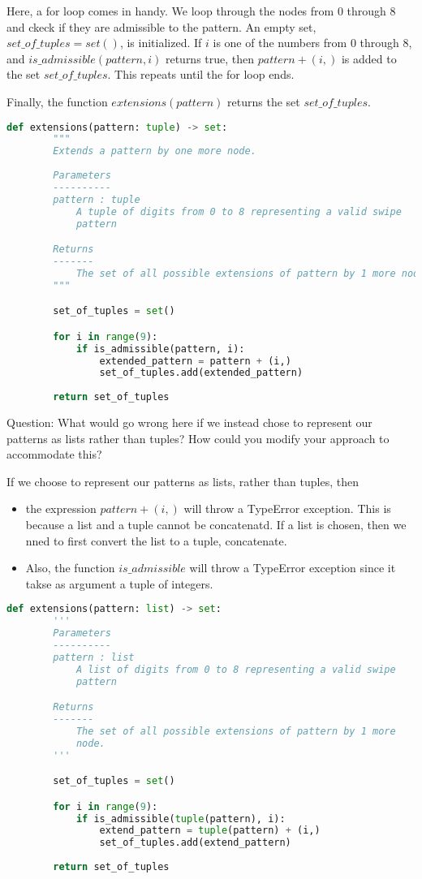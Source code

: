 \documentclass[12pt]{article}
\theoremstyle{definition}
\begin{document}
Here, a for loop comes in handy. We loop through the nodes from $0$ through $8$ and ckeck if they are admissible to the pattern. An empty set, $set\_of\_tuples = set()$, is initialized. 
If $i$ is one of the numbers from 0 through 8, and  $is\_admissible(pattern, i)$ returns true, then $pattern + (i,)$ is added to the set $set\_of\_tuples$. This repeats until the for loop ends.

Finally, the function $extensions(pattern)$ returns the set $set\_of\_tuples$.

\begin{lstlisting}[language=Python, caption=Exercise 4]
    def extensions(pattern: tuple) -> set:
        """
        Extends a pattern by one more node.
        
        Parameters
        ----------
        pattern : tuple
            A tuple of digits from 0 to 8 representing a valid swipe
            pattern

        Returns
        -------
            The set of all possible extensions of pattern by 1 more node. 
        """

        set_of_tuples = set()

        for i in range(9):
            if is_admissible(pattern, i):
                extended_pattern = pattern + (i,)
                set_of_tuples.add(extended_pattern)
            
        return set_of_tuples
\end{lstlisting}

Question: What would go wrong here if we instead chose to represent our patterns as lists rather than tuples? 
How could you modify your approach to accommodate this?

If we choose to represent our patterns as lists, rather than tuples, then
\begin{itemize}
    \item the expression $pattern + (i,)$ will throw a TypeError exception. This is because a list and a tuple cannot be 
    concatenatd. If a list is chosen, then we nned to first convert the list to a tuple, concatenate.
    \item Also, the function $is\_admissible$ will throw a TypeError exception since it takse as argument a tuple of 
    integers.
\end{itemize}

\begin{lstlisting}[language=Python, caption=Modification for  Exercise 4]
    def extensions(pattern: list) -> set:
        '''
        Parameters
        ----------
        pattern : list
            A list of digits from 0 to 8 representing a valid swipe
            pattern

        Returns
        -------
            The set of all possible extensions of pattern by 1 more 
            node. 
        '''

        set_of_tuples = set()

        for i in range(9):
            if is_admissible(tuple(pattern), i):
                extend_pattern = tuple(pattern) + (i,)
                set_of_tuples.add(extend_pattern)
            
        return set_of_tuples
\end{lstlisting}
\end{document}
